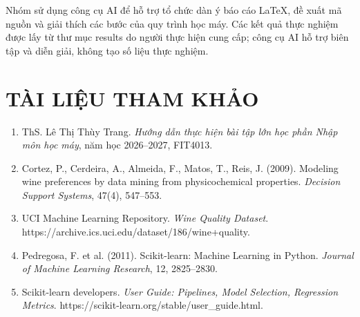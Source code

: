 \documentclass[12pt,a4paper,oneside]{article}
\begin{document}
Nhóm sử dụng công cụ AI để hỗ trợ tổ chức dàn ý báo cáo LaTeX, đề xuất
mã nguồn và giải thích các bước của quy trình học máy. Các kết quả thực
nghiệm được lấy từ thư mục results do người thực hiện cung cấp; công cụ
AI hỗ trợ biên tập và diễn giải, không tạo số liệu thực nghiệm.

\section*{TÀI LIỆU THAM KHẢO}

\begin{enumerate}
\def\labelenumi{\arabic{enumi}.}
\item
  ThS. Lê Thị Thùy Trang. \emph{Hướng dẫn thực hiện bài tập lớn học phần
  Nhập môn học máy}, năm học 2026--2027, FIT4013.
\item
  Cortez, P., Cerdeira, A., Almeida, F., Matos, T., Reis, J. (2009).
  Modeling wine preferences by data mining from physicochemical
  properties. \emph{Decision Support Systems}, 47(4), 547--553.
\item
  UCI Machine Learning Repository. \emph{Wine Quality Dataset}.
  https://archive.ics.uci.edu/dataset/186/wine+quality.
\item
  Pedregosa, F. et al. (2011). Scikit-learn: Machine Learning in Python.
  \emph{Journal of Machine Learning Research}, 12, 2825--2830.
\item
  Scikit-learn developers. \emph{User Guide: Pipelines, Model Selection,
  Regression Metrics}. https://scikit-learn.org/stable/user\_guide.html.
\end{enumerate}
\end{document}

